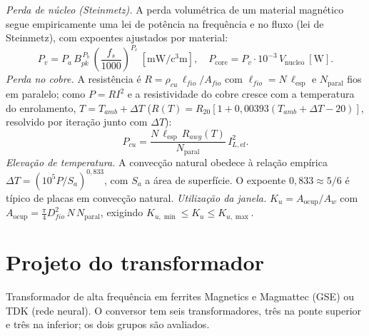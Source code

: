 \documentclass[
	a4paper, 12pt,
	chapter=TITLE, section=Title, subsection=Title,
	oneside, english, brazil, fleqn
]{abntex2}
\begin{document}
\textit{Perda de núcleo (Steinmetz).} A perda volumétrica de um material
magnético segue empiricamente uma lei de potência na frequência e no fluxo (lei
de Steinmetz), com expoentes ajustados por material:
\begin{equation}
	P_v = P_a\,B_{pk}^{\,P_b}\,\!\left(\frac{f_s}{1000}\right)^{\!P_c}\ [\si{\milli\watt\per\cubic\centi\meter}],
	\quad P_{\mathrm{core}}=P_v\cdot10^{-3}\,V_{\mathrm{nucleo}}\ [\si{\watt}].
	\label{eq:pcore}
\end{equation}
\textit{Perda no cobre.} A resistência é $R=\rho_{cu}\,\ell_{fio}/A_{fio}$ com
$\ell_{fio}=N\,\ell_{\mathrm{esp}}$ e $N_{\mathrm{paral}}$ fios em paralelo; como
$P=R I^2$ e a resistividade do cobre cresce com a temperatura do enrolamento,
$T=T_{amb}+\Delta T$ ($R(T)=R_{20}[1+0{,}00393(T_{amb}+\Delta T-20)]$, resolvido
por iteração junto com $\Delta T$):
\begin{equation}
	P_{cu}=\frac{N\,\ell_{\mathrm{esp}}\,R_{awg}(T)}{N_{\mathrm{paral}}}\,I_{L,\mathrm{ef}}^{2}.
	\label{eq:pcu}
\end{equation}
\textit{Elevação de temperatura.} A convecção natural obedece à relação empírica
$\Delta T=(10^{5}P/S_a)^{0{,}833}$, com $S_a$ a área de superfície. O expoente
$0{,}833\approx5/6$ é típico de placas em convecção natural. \textit{Utilização da
janela.} $K_u=A_{\mathrm{ocup}}/A_w$ com
$A_{\mathrm{ocup}}=\tfrac{\pi}{4}D_{fio}^2\,N\,N_{\mathrm{paral}}$, exigindo
$K_{u,\min}\le K_u\le K_{u,\max}$.

\chapter{Projeto do transformador}
Transformador de alta frequência em ferrites Magnetics e Magmattec (GSE) ou TDK
(rede neural). O conversor tem seis transformadores, três na ponte superior e três
na inferior; os dois grupos são avaliados.
\end{document}
